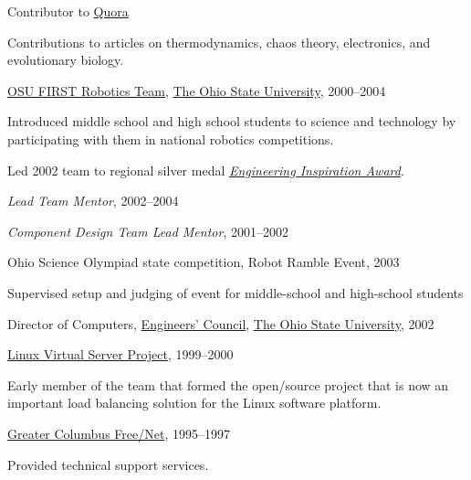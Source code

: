 \documentclass[10pt]{article}           %
\newcommand{\halfblankline}{\quad\vspace{-0.5\baselineskip}\pagebreak[3]}
\begin{document}
\halfblankline

Contributor to \href{http://www.quora.com/}{Quora}
%
\begin{cvlist}
    \item Contributions to articles on thermodynamics, chaos theory,
        electronics, and evolutionary biology.
\end{cvlist}

\halfblankline

\href{http://www.osufirst.org/}{OSU FIRST Robotics Team},
\href{http://www.osu.edu}{The Ohio State University}, 2000--2004
\begin{cvlist}
    \item Introduced middle school and high school students to science and
            technology by participating with them in national robotics
            competitions.
    \item Led 2002 team to regional silver medal
            \href{http://www.firstwiki.org/Engineering_Inspiration_Award}
                 {\emph{Engineering Inspiration Award}}.
    \item \emph{Lead Team Mentor}, 2002--2004
    \item \emph{Component Design Team Lead Mentor}, 2001--2002
\end{cvlist}

\halfblankline

Ohio Science Olympiad state competition, Robot Ramble Event, 2003
%
\begin{cvlist}
    \item Supervised setup and judging of event for middle-school and
        high-school students
\end{cvlist}

\halfblankline

Director of Computers,
\href{http://ec.osu.edu/}{Engineers' Council},
\href{http://www.osu.edu/}{The Ohio State University}, 2002

\halfblankline

\href{http://www.linuxvirtualserver.org/}
     {Linux Virtual Server Project}, 1999--2000
\begin{cvlist}
    \item Early member of the team that formed the open\-/source project that
            is now an important load balancing solution for the Linux
            software platform.
\end{cvlist}

\halfblankline

\href{http://www.gcfn.org/}
     {Greater Columbus Free\-/Net}, 1995--1997
\begin{cvlist}
    \item Provided technical support services.
\end{cvlist}
\end{document}
